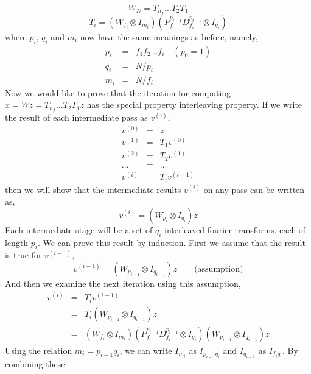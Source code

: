 \documentclass[fleqn,12pt]{article}
\begin{document}
%
\begin{equation}
W_N = T_{n_f} \dots T_2 T_1
\end{equation}
%
\begin{equation}
T_i = (W_{f_i} \otimes I_{m_i}) 
        (P^{p_{i-1}}_{f_i} D^{p_{i-1}}_{f_i} \otimes I_{q_i})
\end{equation}
%
where $p_i$, $q_i$ and $m_i$ now have the same meanings as before,
namely,
%
\begin{eqnarray}
p_i &=& f_1 f_2 \dots f_i \quad (p_0 = 1)  \\
q_i &=& N / p_i \\
m_i &=& N / f_i 
\end{eqnarray}
%
Now we would like to prove that the iteration for computing $x = W z =
T_{n_f} \dots T_2 T_1 z$ has the special property interleaving
property. If we write the result of each intermediate pass as
$v^{(i)}$,
%
\begin{eqnarray}
v^{(0)} &=& z \\
v^{(1)} &=& T_1 v^{(0)} \\
v^{(2)} &=& T_2 v^{(1)} \\
\dots   &=& \dots \\
v^{(i)} &=& T_i v^{(i-1)} 
\end{eqnarray}
%
then we will show that the intermediate results $v^{(i)}$ on any pass
can be written as,
%
\begin{equation}
v^{(i)} = (W_{p_i} \otimes I_{q_i}) z
\end{equation}
%
Each intermediate stage will be a set of $q_i$ interleaved fourier
transforms, each of length $p_i$. We can prove this result by
induction. First we assume that the result is true for $v^{(i-1)}$,
%
\begin{equation}
v^{(i-1)} = (W_{p_{i-1}} \otimes I_{q_{i-1}}) z \qquad \mbox{(assumption)}
\end{equation}
%
And then we examine the next iteration using this assumption,
%
\begin{eqnarray}
v^{(i)} &=& T_i v^{(i-1)} \\
        &=& T_i (W_{p_{i-1}} \otimes I_{q_{i-1}}) z \\
        &=& (W_{f_i} \otimes I_{m_i}) 
                (P^{p_{i-1}}_{f_i} D^{p_{i-1}}_{f_i} \otimes I_{q_i})
                (W_{p_{i-1}} \otimes I_{q_{i-1}}) z \label{dit-induction}
\end{eqnarray}
%
Using the relation $m_i = p_{i-1} q_i$, we can write $I_{m_i}$ as
$I_{p_{i-1} q_i}$ and $I_{q_{i-1}}$ as $I_{f_i q_i}$. By combining these
\end{document}
